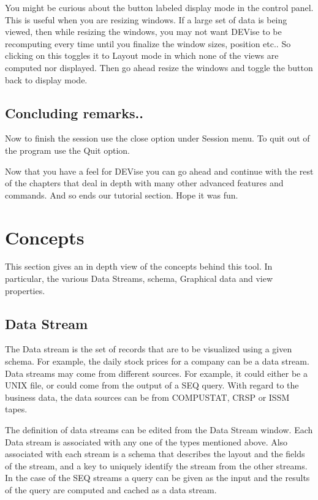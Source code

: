 	
	You might be curious about the button labeled display mode in the control panel. This is useful when you are resizing windows. If a large set of data is being viewed, then while resizing the windows, you may not want DEVise to be recomputing every time until you finalize the window sizes, position etc.. So clicking on this toggles it to Layout mode in which none of the views are computed nor displayed. Then go ahead resize the windows and toggle the button back to display mode.



\subsection{ Concluding remarks..}

	Now to finish the session use the close option under Session menu. To quit out of the program use the Quit option.
	
	Now that you have a feel for DEVise you can go ahead and continue with the rest of the chapters that deal in depth with many other advanced features and commands. And so ends our tutorial section. Hope it was fun.


\newpage

\section{\Devise Concepts}

	 This section gives an in depth view of the concepts behind this tool. In particular, the various Data Streams, schema, Graphical data and view properties. 

\subsection{Data Stream}

	The Data stream is the set of records that are to be visualized using a given schema. For example, the daily stock prices for a company can be a data stream. Data streams may come from different sources. For example, it could either be a UNIX file, or could come from the output of a SEQ query. With regard to the business data, the data sources can be from COMPUSTAT, CRSP or ISSM tapes.

	The definition of data streams can be edited from the Data Stream window. Each Data  stream is associated with any one of the types mentioned above. Also associated with each stream is a schema that describes the layout and the fields of the stream, and a key to uniquely identify the stream from the other streams. In the case of the SEQ streams a query can be given as the input and the results of the query are computed and cached as a data stream.

